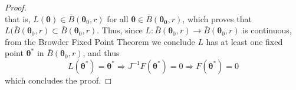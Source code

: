 \documentclass[lineno]{biometrika}
\newcommand{\bs}{\boldsymbol}
\begin{document}
\begin{proof}
\begin{equation*}
\end{equation*}
that is, $L(\bs{\theta})\in \bar{B}(\bs{\theta}_0,r)$ for all $\bs{\theta}\in \bar{B}(\bs{\theta_0},r)$, which proves that $L(\bar{B}(\bs{\theta}_0,r)\subset \bar{B}(\bs{\theta}_0,r)$. Thus, since $L:\bar{B}(\bs{\theta}_0,r)\to \bar{B}( \bs{\theta}_0,r)$ is continuous, from the Browder Fixed Point Theorem we conclude $L$ has at least one fixed point $\bs{\theta}^*$ in $\bar{B}(\bs{\theta}_0,r)$, and thus
\begin{equation*}L(\bs{\theta}^*)=\bs{\theta}^*\Rightarrow J^{-1}F(\bs{\theta}^*)=0\Rightarrow F(\bs{\theta}^*)=0
\end{equation*}
which concludes the proof.
\end{proof}



 
\end{document}

